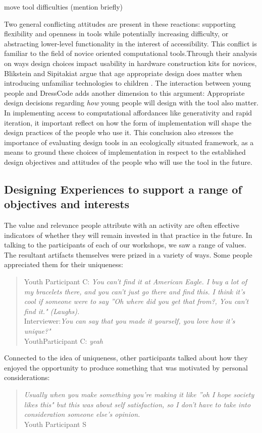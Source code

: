 \documentclass{sigchi}
\begin{document}
move tool difficulties (mention briefly)

Two general conflicting attitudes are present in these reactions: supporting flexibility and openness in tools while potentially increasing difficulty, or abstracting lower-level functionality in the interest of accessibility. This conflict is familiar to the field of novice oriented computational tools.Through their analysis on ways design choices impact usability in hardware construction kits for novices, Blikstein and Sipitakiat argue that age appropriate design does matter when introducing unfamiliar technologies to children \cite{blik}. The interaction between young people and DressCode adds another dimension to this argument: Appropriate design decisions regarding \textit{how} young people will design with the tool also matter. In implementing access to computational affordances like generativity and rapid iteration, it important reflect on how the form of implementation will shape the design practices of the people who use it. This conclusion also stresses the importance of evaluating design tools in an ecologically situated framework, as a means to ground these choices of implementation in respect to the established design objectives and attitudes of the people who will use the tool in the future.

\subsection{Designing Experiences to support a range of objectives and interests}
The value and relevance people attribute with an activity are often effective indicators of whether they will remain invested in that practice in the future. In talking to the participants of each of our workshops, we saw a range of values. The resultant artifacts themselves were prized in a variety of ways. Some people appreciated them for their uniqueness:
\begin{quotation}
Youth Participant C: \textit{You can't find it at American Eagle. I buy a lot of my bracelets there, and you can't just go there and find this. I think it's cool if someone were to say ''Oh where did you get that from?, You can't find it." (Laughs).}
\\Interviewer:\textit{You can say that you made it yourself, you love how it's unique?"}
\\YouthParticipant C: \textit{yeah}
\end{quotation}

Connected to the idea of uniqueness, other participants talked about how they enjoyed the opportunity to produce something that was motivated by personal considerations:
\begin{quotation}
\textit{Usually when you make something you're making it like ''oh I hope society likes this" but this was about self satisfaction, so I don't have to take into consideration someone else's opinion.}
\\Youth Participant S
\end{quotation}
\end{document}
